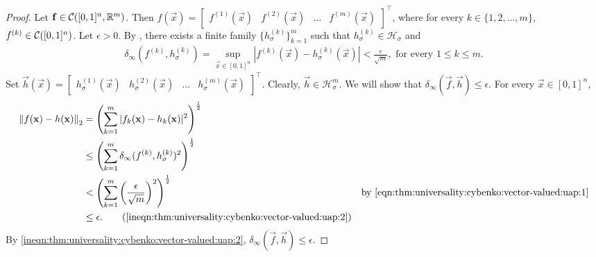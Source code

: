 \begin{proof}
Let $\mathbf{f} \in {\mathcal C}([0,1]^n, {\mathbb R}^m)$. Then $f(\vec{x}) = \begin{bmatrix} f^{(1)}(\vec{x}) & f^{(2)}(\vec{x}) & \ldots & f^{(m)}(\vec{x}) \end{bmatrix}^{\top}$, where for every $k \in \{ 1, 2, \ldots, m \}$, $f^{(k)} \in {\mathcal C}([0,1]^n)$. Let $\epsilon > 0$. By , there exists a finite family $\{  h_\sigma^{(k)} \}_{k=1}^m$ such that $h_\sigma^{(k)} \in \mathcal{H}_{\sigma}$ and \begin{align}
    \label{eqn:thm:universality:cybenko:vector-valued:uap:1}
    \delta_\infty(f^{(k)}, h_\sigma^{(k)}) = \sup_{\vec{x} \in [0,1]^n} | f^{(k)} (\vec{x}) - h_\sigma^{(k)}(\vec{x})  | < \frac{\epsilon}{\sqrt{m}}, \text{ for every $1 \leq k \leq m$.}
\end{align}
Set $\vec{h}(\vec{x}) = \begin{bmatrix}  h_\sigma^{(1)}(\vec{x}) & h_\sigma^{(2)}(\vec{x}) & \ldots & h_\sigma^{(m)}(\vec{x}) \end{bmatrix}^{\top}$. Clearly, $\vec{h} \in \mathcal{H}_{\sigma}^m$. We will show that $\delta_\infty(\vec{f}, \vec{h})  \leq \epsilon$. For every $\vec{x} \in [0,1]^n$,
\begin{subequations}\label{ineqn:thm:universality:cybenko:vector-valued:uap:2}
\begin{align*}
    \norm{f(\vec{x}) - h(\vec{x})}_2 &= \left(\sum_{k=1}^m | f_k(\vec{x}) - h_k(\vec{x})| ^ 2  \right )^{\frac{1}{2}} & \\ 
                   &\leq \left ( \sum_{k=1}^m \delta_\infty(f^{(k)}, h_\sigma^{(k)})^2 \right) ^{\frac{1}{2}} & \\
                   &< \left( \sum_{k=1}^m  \left (\frac{\epsilon}{\sqrt{m}} \right)^2 \right )^{\frac{1}{2}} & \text{by \ref{eqn:thm:universality:cybenko:vector-valued:uap:1}}  \\
                   &\leq \epsilon.
     \tag{\ref{ineqn:thm:universality:cybenko:vector-valued:uap:2}}
\end{align*}
\end{subequations}
By \ref{ineqn:thm:universality:cybenko:vector-valued:uap:2}, $\delta_\infty(\vec{f}, \vec{h}) \leq \epsilon$. 
\end{proof}
\newpage
